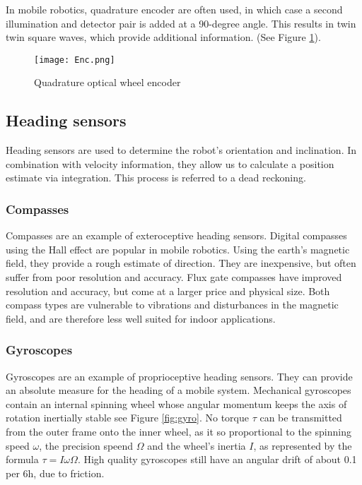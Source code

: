 \begin{itemize}
In mobile robotics, quadrature encoder are often used, in which case a second illumination and detector pair is added at a 90-degree angle. This results in twin twin square waves, which provide additional information. (See Figure \ref{fig:encoder}).

\begin{figure}[H]
\centering
        \texttt{[image: Enc.png]}
        \caption{Quadrature optical wheel encoder \cite{SNS}}
        \label{fig:encoder}
\end{figure}





\subsection{Heading sensors}
Heading sensors are used to determine the robot’s orientation and inclination. In combination with velocity information, they allow us to calculate a position estimate via integration. This process is referred to a dead reckoning.
\subsubsection{Compasses}
Compasses are an example of exteroceptive heading sensors. Digital compasses using the Hall effect are popular in mobile robotics. Using the earth's magnetic field, they provide a rough estimate of direction. They are inexpensive, but often suffer from poor resolution and accuracy. Flux gate compasses have improved resolution and accuracy, but come at a larger price and physical size. Both compass types are vulnerable to vibrations and disturbances in the magnetic field, and are therefore less well suited for indoor applications.

\subsubsection{Gyroscopes}
Gyroscopes are an example of proprioceptive heading sensors. They can provide an absolute measure for the heading of a mobile system. Mechanical gyroscopes contain an internal spinning wheel whose angular momentum keeps the axis of rotation inertially stable see Figure \ref{fig:gyro}. No torque $\tau$ can be transmitted from the outer frame onto the inner wheel, as it so proportional to the spinning speed $\omega$, the precision speend $\Omega$ and the wheel's inertia $I$, as represented by the formula $\tau = I\omega\Omega$. High quality gyroscopes still have an angular drift of about 0.1 per 6h, due to friction.


\end{itemize}
